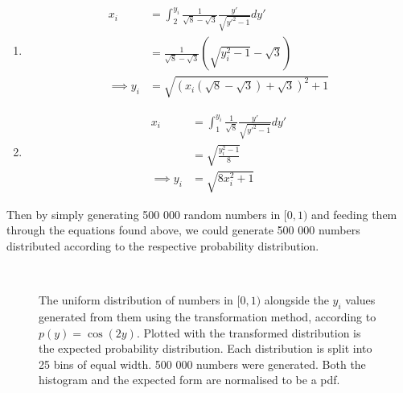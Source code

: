 \documentclass[11pt]{article}
\begin{document}
\begin{enumerate}
\begin{enumerate}
\begin{enumerate}[label=\roman*)]
            \item \label{itm:q2aii}
            \begin{align*}
                x_i&=\int_2^{y_i}\frac{1}{\sqrt 8 - \sqrt 3}\frac{y'}{\sqrt{y'^2-1}}dy'\\
                &=\frac{1}{\sqrt 8 - \sqrt 3}\left(\sqrt{y_i^2-1}-\sqrt 3\right)\\
                \implies y_i&=\sqrt{(x_i(\sqrt{8}-\sqrt{3})+\sqrt{3})^2+1}
            \end{align*}

            \item \label{itm:q2aiii}
            \begin{align*}
                x_i&=\int_1^{y_i}\frac{1}{\sqrt 8}\frac{y'}{\sqrt{y'^2-1}}dy'\\
                &=\sqrt{\frac{y_i^2-1}{8}}\\
                \implies y_i&=\sqrt{8x_i^2+1}
            \end{align*}
        \end{enumerate}
        Then by simply generating 500 000 random numbers in $[0,1)$ and feeding them through the equations found above, we could generate 500 000 numbers distributed according to the respective probability distribution.

        \begin{figure}[H]%
            \centering
            \,
            \caption{The uniform distribution of numbers in $[0,1)$ alongside the $y_i$ values generated from them using the transformation method, according to $p(y)=\cos(2y)$. Plotted with the transformed distribution is the expected probability distribution. Each distribution is split into 25 bins of equal width. 500 000 numbers were generated. Both the histogram and the expected form are normalised to be a pdf.}
            \label{fig:q2ai}
        \end{figure}


\end{enumerate}
\end{enumerate}
\end{document}
